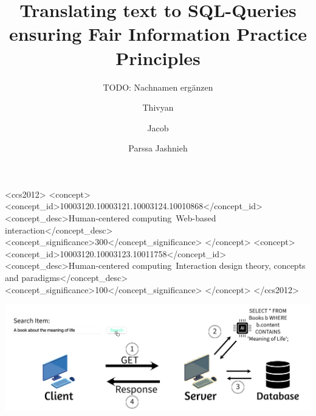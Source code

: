 \documentclass[manuscript,review]{acmart}
\begin{document}
\title{Translating text to SQL-Queries ensuring Fair Information Practice Principles}
\author{TODO: Nachnamen ergänzen}
\author{Thivyan}
\author{Jacob}
\author{Parssa Jashnieh}
\address{Bergische Universität Wuppertal}




\begin{CCSXML}
  <ccs2012>
     <concept>
         <concept_id>10003120.10003121.10003124.10010868</concept_id>
         <concept_desc>Human-centered computing~Web-based interaction</concept_desc>
         <concept_significance>300</concept_significance>
         </concept>
     <concept>
         <concept_id>10003120.10003123.10011758</concept_id>
         <concept_desc>Human-centered computing~Interaction design theory, concepts and paradigms</concept_desc>
         <concept_significance>100</concept_significance>
         </concept>
   </ccs2012>
\end{CCSXML}
  


\maketitle

\includegraphics[width=\textwidth]{images/front_image}
\end{document}
